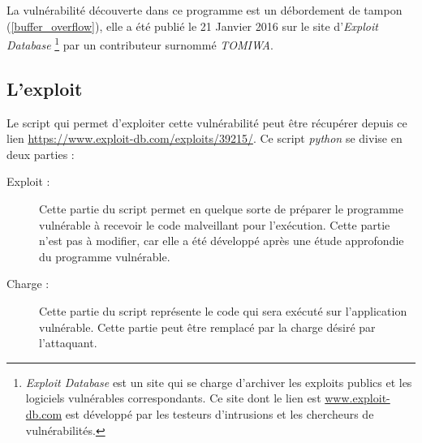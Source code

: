     La vulnérabilité découverte dans ce programme est un débordement de tampon (\autoref{buffer_overflow}), 
    elle a été publié le 21 Janvier 2016 sur le site d'\emph{Exploit Database} 
    \footnote{\emph{Exploit Database} est un site qui se charge d'archiver les exploits publics et les 
    logiciels vulnérables correspondants. Ce site dont le lien est \url{www.exploit-db.com} est développé 
    par les testeurs d'intrusions et les chercheurs de vulnérabilités.} par un contributeur surnommé \emph{TOMIWA}.


    \subsection{L'exploit}
    Le script qui permet d'exploiter cette vulnérabilité peut être récupérer depuis ce lien 
    \url{https://www.exploit-db.com/exploits/39215/}.
    Ce script \emph{python} \cite{python} se divise en deux parties :
    \begin{description}
        \item[Exploit :] Cette partie du script permet en quelque sorte de préparer le programme vulnérable à 
            recevoir le code malveillant pour l'exécution. Cette partie n'est pas à modifier, car elle a été développé
            après une étude approfondie du programme vulnérable.

        \item[Charge :] Cette partie du script représente le code qui sera exécuté sur l'application vulnérable. 
            Cette partie peut être remplacé par la charge désiré par l'attaquant.
    \end{description}

